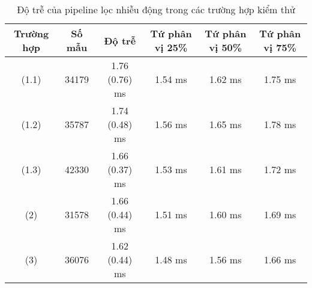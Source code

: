 		\begin{table}[h]
			\centering
			\begin{tabular}{c c c c c c}
				\hline
				\textbf{Trường hợp}	& \textbf{Số mẫu}	& \textbf{Độ trễ}	& \textbf{Tứ phân vị 25\%}	& \textbf{Tứ phân vị 50\%}	& \textbf{Tứ phân vị 75\%} \\
				\hline
				(1.1)				& 34179				& 1.76 (0.76) ms	& 1.54 ms					& 1.62 ms			& 1.75 ms \\
				(1.2)				& 35787				& 1.74 (0.48) ms	& 1.56 ms					& 1.65 ms			& 1.78 ms \\
				(1.3)				& 42330				& 1.66 (0.37) ms	& 1.53 ms					& 1.61 ms			& 1.72 ms \\
				(2)					& 31578				& 1.66 (0.44) ms	& 1.51 ms					& 1.60 ms			& 1.69 ms \\
				(3)					& 36076				& 1.62 (0.44) ms	& 1.48 ms					& 1.56 ms			& 1.66 ms \\
				\hline
			\end{tabular}
			\caption{Độ trễ của pipeline lọc nhiễu động trong các trường hợp kiểm thử}
			\label{re::svc_latency_detail}
		\end{table}
	
